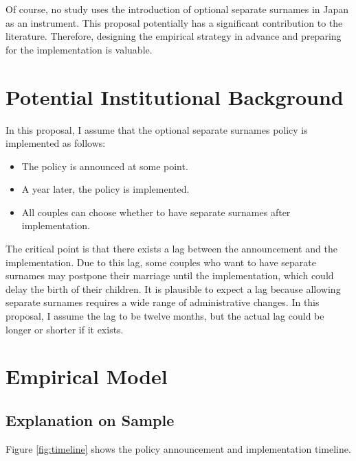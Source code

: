 \documentclass[12pt]{article}
\begin{document}
Of course, no study uses the introduction of optional separate surnames in Japan as an instrument.
This proposal potentially has a significant contribution to the literature.
Therefore, designing the empirical strategy in advance and preparing for the implementation is valuable.


\section{Potential Institutional Background}
In this proposal, I assume that the optional separate surnames policy is implemented as follows: 
\begin{itemize}
  \item The policy is announced at some point. 
  \item A year later, the policy is implemented.
  \item All couples can choose whether to have separate surnames after implementation.
\end{itemize}
The critical point is that there exists a lag between the announcement and the implementation.
Due to this lag, some couples who want to have separate surnames may postpone their marriage until the implementation, which could delay the birth of their children.
It is plausible to expect a lag because allowing separate surnames requires a wide range of administrative changes.
In this proposal, I assume the lag to be twelve months, but the actual lag could be longer or shorter if it exists.

\section{Empirical Model}
\subsection*{Explanation on Sample}
Figure \ref{fig:timeline} shows the policy announcement and implementation timeline.
\end{document}
